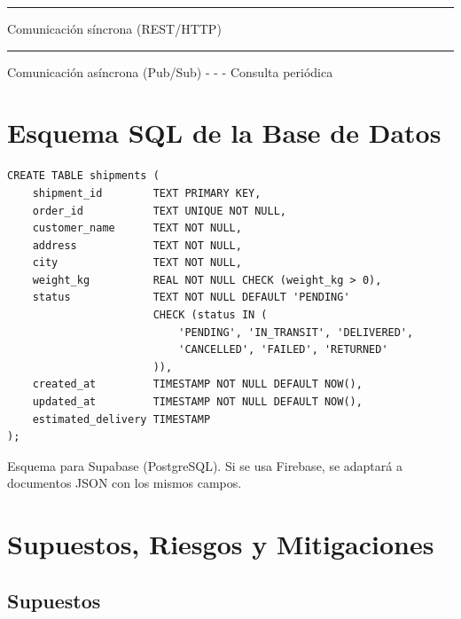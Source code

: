 \documentclass[11pt, a4paper]{article}
\begin{document}
\vspace{0.5cm}
\begin{center}
{\footnotesize
  \textcolor{info}{\rule{0.6cm}{2pt}} Comunicación síncrona (REST/HTTP) \qquad
  \textcolor{success}{\rule{0.6cm}{2pt}} Comunicación asíncrona (Pub/Sub) \qquad
  \textcolor{info}{- - -} Consulta periódica
}
\end{center}


\section{Esquema SQL de la Base de Datos}

\begin{lstlisting}
CREATE TABLE shipments (
    shipment_id        TEXT PRIMARY KEY,
    order_id           TEXT UNIQUE NOT NULL,
    customer_name      TEXT NOT NULL,
    address            TEXT NOT NULL,
    city               TEXT NOT NULL,
    weight_kg          REAL NOT NULL CHECK (weight_kg > 0),
    status             TEXT NOT NULL DEFAULT 'PENDING'
                       CHECK (status IN (
                           'PENDING', 'IN_TRANSIT', 'DELIVERED',
                           'CANCELLED', 'FAILED', 'RETURNED'
                       )),
    created_at         TIMESTAMP NOT NULL DEFAULT NOW(),
    updated_at         TIMESTAMP NOT NULL DEFAULT NOW(),
    estimated_delivery TIMESTAMP
);
\end{lstlisting}

\begin{infobox}
  Esquema para Supabase (PostgreSQL). Si se usa Firebase,
  se adaptará a documentos JSON con los mismos campos.
\end{infobox}


\section{Supuestos, Riesgos y Mitigaciones}

\subsection{Supuestos}
\end{document}
